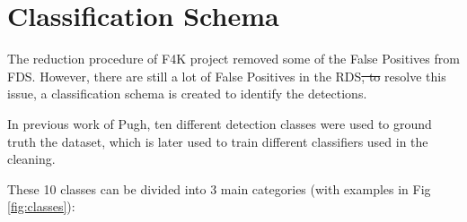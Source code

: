 \documentclass[bsc,logo,twoside,fullspacing,parskip]{infthesis}
\providecommand{\DIFadd}[1]{{\protect\color{blue}\uwave{#1}}} %
\providecommand{\DIFdel}[1]{{\protect\color{red}\sout{#1}}}                      %
\providecommand{\DIFaddbegin}{} %
\providecommand{\DIFaddend}{} %
\providecommand{\DIFdelbegin}{} %
\providecommand{\DIFdelend}{} %
\newcommand{\DIFscaledelfig}{0.5}
\newlength{\DIFdelgraphicswidth} %
\newlength{\DIFdelgraphicsheight} %
\newcommand{\DIFaddincludegraphics}[2][]{{\color{blue}\fbox{\DIFOincludegraphics[#1]{#2}}}} %
\newcommand{\DIFdelincludegraphics}[2][]{%
\sbox{\DIFdelgraphicsbox}{\DIFOincludegraphics[#1]{#2}}%
\settoboxwidth{\DIFdelgraphicswidth}{\DIFdelgraphicsbox} %
\settoboxtotalheight{\DIFdelgraphicsheight}{\DIFdelgraphicsbox} %
\scalebox{\DIFscaledelfig}{%
\parbox[b]{\DIFdelgraphicswidth}{\usebox{\DIFdelgraphicsbox}\\[-\baselineskip] \rule{\DIFdelgraphicswidth}{0em}}\llap{\resizebox{\DIFdelgraphicswidth}{\DIFdelgraphicsheight}{%
\setlength{\unitlength}{\DIFdelgraphicswidth}%
\begin{picture}(1,1)%
\thicklines\linethickness{2pt} %
{\color[rgb]{1,0,0}\put(0,0){\framebox(1,1){}}}%
{\color[rgb]{1,0,0}\put(0,0){\line( 1,1){1}}}%
{\color[rgb]{1,0,0}\put(0,1){\line(1,-1){1}}}%
\end{picture}%
}\hspace*{3pt}}} %
} %
\DeclareRobustCommand{\DIFaddbegin}{\DIFOaddbegin \let\includegraphics\DIFaddincludegraphics} %
\DeclareRobustCommand{\DIFaddend}{\DIFOaddend \let\includegraphics\DIFOincludegraphics} %
\DeclareRobustCommand{\DIFdelbegin}{\DIFOdelbegin \let\includegraphics\DIFdelincludegraphics} %
\DeclareRobustCommand{\DIFdelend}{\DIFOaddend \let\includegraphics\DIFOincludegraphics} %
\begin{document}
\section{Classification Schema}
\label{sec:schema}

The reduction procedure of F4K project removed some of the False Positives from FDS. 
However, there are still a lot of False Positives in the RDS\DIFdelbegin \DIFdel{, to }\DIFdelend \DIFaddbegin \DIFadd{. 
To }\DIFaddend resolve this issue, a classification schema is created to identify the detections.

In \DIFaddbegin \DIFadd{the }\DIFaddend previous work of Pugh\cite{Pugh}, ten different detection classes were used to ground truth the dataset, which is later used to train different classifiers used in the cleaning. 

These 10 classes can be divided into 3 main categories (with examples in Fig \ref{fig:classes}):

\renewcommand{\labelenumi}{\bfseries\Roman{enumi}}
\renewcommand{\labelenumii}{\bfseries\arabic{enumii}}
\renewcommand{\labelenumiii}{\bfseries\roman{enumiii}}
\end{document}
